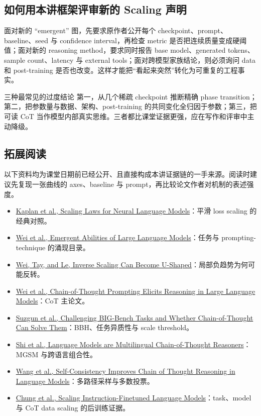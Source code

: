 \subsection{如何用本讲框架评审新的 Scaling 声明}

面对新的 ``emergent'' 图，先要求原作者公开每个 checkpoint、prompt、baseline、seed 与 confidence interval，再检查 metric 是否把连续质量变成硬阈值；面对新的 reasoning method，要求同时报告 base model、generated tokens、sample count、latency 与 external tools；面对跨模型家族结论，则必须询问 data 和 post-training 是否也改变。这样才能把“看起来突然”转化为可重复的工程事实。

\begin{warningbox}{三种最常见的过度结论}
第一，从几个稀疏 checkpoint 推断精确 phase transition；第二，把参数量与数据、架构、post-training 的共同变化全归因于参数；第三，把可读 CoT 当作模型内部真实思维。三者都比课堂证据更强，应在写作和评审中主动降级。
\end{warningbox}

\subsection{拓展阅读}

以下资料均为课堂日期前已经公开、且直接构成本讲证据链的一手来源。阅读时建议先复现一张曲线的 axes、baseline 与 prompt，再比较论文作者对机制的表述强度。

\begin{itemize}
  \item \href{https://arxiv.org/abs/2001.08361}{Kaplan et al., Scaling Laws for Neural Language Models}：平滑 loss scaling 的经典对照。
  \item \href{https://arxiv.org/abs/2206.07682}{Wei et al., Emergent Abilities of Large Language Models}：任务与 prompting-technique 的涌现目录。
  \item \href{https://arxiv.org/abs/2211.02011}{Wei, Tay, and Le, Inverse Scaling Can Become U-Shaped}：局部负趋势为何可能反转。
  \item \href{https://arxiv.org/abs/2201.11903}{Wei et al., Chain-of-Thought Prompting Elicits Reasoning in Large Language Models}：CoT 主论文。
  \item \href{https://arxiv.org/abs/2210.09261}{Suzgun et al., Challenging BIG-Bench Tasks and Whether Chain-of-Thought Can Solve Them}：BBH、任务异质性与 scale threshold。
  \item \href{https://arxiv.org/abs/2210.03057}{Shi et al., Language Models are Multilingual Chain-of-Thought Reasoners}：MGSM 与跨语言组合性。
  \item \href{https://arxiv.org/abs/2203.11171}{Wang et al., Self-Consistency Improves Chain of Thought Reasoning in Language Models}：多路径采样与多数投票。
  \item \href{https://arxiv.org/abs/2210.11416}{Chung et al., Scaling Instruction-Finetuned Language Models}：task、model 与 CoT data scaling 的后训练证据。
\end{itemize}

